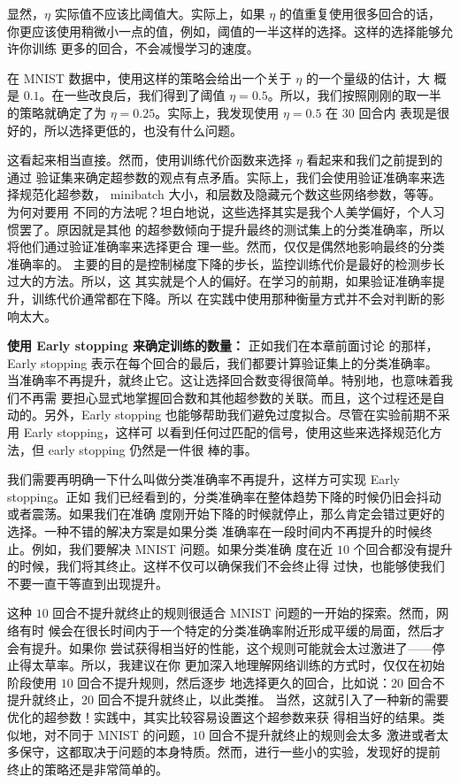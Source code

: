 显然，$\eta$ 实际值不应该比阈值大。实际上，如果 $\eta$ 的值重复使用很多回合的话，
你更应该使用稍微小一点的值，例如，阈值的一半这样的选择。这样的选择能够允许你训练
更多的回合，不会减慢学习的速度。

在 MNIST 数据中，使用这样的策略会给出一个关于\learningrate{} $\eta$ 的一个量级的估计，大
概是 $0.1$。在一些改良后，我们得到了阈值 $\eta=0.5$。所以，我们按照刚刚的取一半
的策略就确定了\learningrate{}为 $\eta=0.25$。实际上，我发现使用 $\eta=0.5$ 在 $30$ 回合内
表现是很好的，所以选择更低的\learningrate{}，也没有什么问题。

这看起来相当直接。然而，使用训练代价函数来选择 $\eta$ 看起来和我们之前提到的通过
验证集来确定超参数的观点有点矛盾。实际上，我们会使用验证准确率来选择规范化超参数，
minibatch 大小，和层数及隐藏元个数这些网络参数，等等。为何对\learningrate{}要用
不同的方法呢？坦白地说，这些选择其实是我个人美学偏好，个人习惯罢了。原因就是其他
的超参数倾向于提升最终的测试集上的分类准确率，所以将他们通过验证准确率来选择更合
理一些。然而，\learningrate{}仅仅是偶然地影响最终的分类准确率的。\learningrate{}%
主要的目的是控制梯度下降的步长，监控训练代价是最好的检测步长过大的方法。所以，这
其实就是个人的偏好。在学习的前期，如果验证准确率提升，训练代价通常都在下降。所以
在实践中使用那种衡量方式并不会对判断的影响太大。

\textbf{使用 Early stopping 来确定训练的\epochs{}数量：} 正如我们在本章前面讨论
的那样，Early stopping 表示在每个回合的最后，我们都要计算验证集上的分类准确率。
当准确率不再提升，就终止它。这让选择回合数变得很简单。特别地，也意味着我们不再需
要担心显式地掌握回合数和其他超参数的关联。而且，这个过程还是自动的。另外，Early
stopping 也能够帮助我们避免过度拟合。尽管在实验前期不采用 Early stopping，这样可
以看到任何过匹配的信号，使用这些来选择规范化方法，但 early stopping 仍然是一件很
棒的事。

我们需要再明确一下什么叫做分类准确率不再提升，这样方可实现 Early stopping。正如
我们已经看到的，分类准确率在整体趋势下降的时候仍旧会抖动或者震荡。如果我们在准确
度刚开始下降的时候就停止，那么肯定会错过更好的选择。一种不错的解决方案是如果分类
准确率在一段时间内不再提升的时候终止。例如，我们要解决 MNIST 问题。如果分类准确
度在近 $10$ 个回合都没有提升的时候，我们将其终止。这样不仅可以确保我们不会终止得
过快，也能够使我们不要一直干等直到出现提升。

这种 $10$ 回合不提升就终止的规则很适合 MNIST 问题的一开始的探索。然而，网络有时
候会在很长时间内于一个特定的分类准确率附近形成平缓的局面，然后才会有提升。如果你
尝试获得相当好的性能，这个规则可能就会太过激进了——停止得太草率。所以，我建议在你
更加深入地理解网络训练的方式时，仅仅在初始阶段使用 $10$ 回合不提升规则，然后逐步
地选择更久的回合，比如说：$20$ 回合不提升就终止，$20$ 回合不提升就终止，以此类推。
当然，这就引入了一种新的需要优化的超参数！实践中，其实比较容易设置这个超参数来获
得相当好的结果。类似地，对不同于 MNIST 的问题，$10$ 回合不提升就终止的规则会太多
激进或者太多保守，这都取决于问题的本身特质。然而，进行一些小的实验，发现好的提前
终止的策略还是非常简单的。

